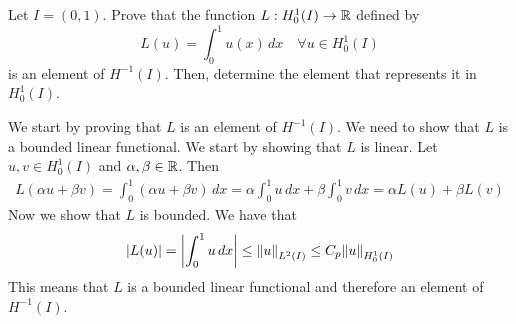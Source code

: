 \begin{enumerate}
\end{enumerate}

\newpage    
\begin{exercise}
    Let \(I = (0,1)\). Prove that the function \(L: H^1_0(I) \to \mathbb{R}\) defined by
    \[
        L(u) = \int_0^1 u(x) \, dx \quad \forall u \in H^1_0(I)
    \]
    is an element of \(H^{-1}(I)\). Then, determine the element that represents it in \(H^1_0(I)\).
\end{exercise}
We start by proving that \(L\) is an element of \(H^{-1}(I)\). We need to show that \(L\) is a bounded linear functional. We start by showing that \(L\) is linear. Let \(u, v \in H^1_0(I)\) and \(\alpha, \beta \in \mathbb{R}\). Then
\[
    \begin{split}
        L(\alpha u + \beta v) = \int_0^1 (\alpha u + \beta v) \, dx = \alpha \int_0^1 u \, dx + \beta \int_0^1 v \, dx = \alpha L(u) + \beta L(v)
    \end{split}
\]
Now we show that \(L\) is bounded. We have that
\[
    \begin{split}
        \abs{L(u)} = \abs{\int_0^1 u \, dx} \leq \norm{u}_{L^2(I)} \leq C_p \norm{u}_{H^1_0(I)}
    \end{split}
\]
This means that \(L\) is a bounded linear functional and therefore an element of \(H^{-1}(I)\). 

